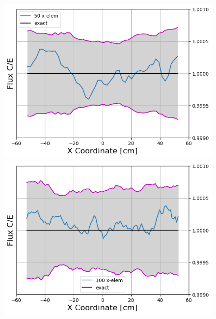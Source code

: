 \documentclass[letterpaper]{mc2023}
\begin{document}
\begin{figure}[H]
    \centering
    \begin{minipage}[b]{0.49\linewidth}
        \includegraphics[width=\linewidth]{figures/50_flux_CE_error_bars.png}
    \end{minipage}
    \begin{minipage}[b]{0.49\linewidth}
        \includegraphics[width=\linewidth]{figures/100_flux_CE_error_bars.png}
    \end{minipage}
    \begin{minipage}[b]{0.49\linewidth}

\end{minipage}
\end{figure}
\end{document}
